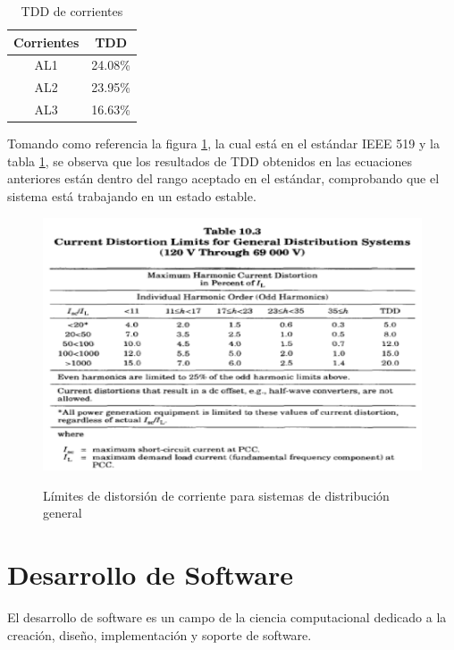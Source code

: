 \begin{table}[!htbp]
\begin{center}
\begin{tabular}{ |c|c| } 
\hline
Corrientes & TDD\\
\hline
AL1 & 24.08\%\\
\hline
AL2 & 23.95\%\\
\hline
AL3 & 16.63\%\\
\hline
\end{tabular}
\end{center}
\caption{TDD de corrientes}
\label{tab:tdd-corriente}
\end{table}

Tomando como referencia la figura \ref{fig:límites-corriente}, la cual está en el estándar IEEE 519 y la tabla \ref{tab:tdd-corriente}, se observa que los resultados de TDD obtenidos en las ecuaciones anteriores están dentro del rango aceptado en el estándar, comprobando que el sistema está trabajando en un estado estable. 

\begin{figure}[H]
\centering
\includegraphics{2Marco/limites-distorsion-corriente}
\caption{Límites de distorsión de corriente para sistemas de distribución general} \cite{A45}
\label{fig:límites-corriente}
\end{figure} 

\section{Desarrollo de Software}

El desarrollo de software es un campo de la ciencia computacional dedicado a la creación, diseño, implementación y soporte de software.

